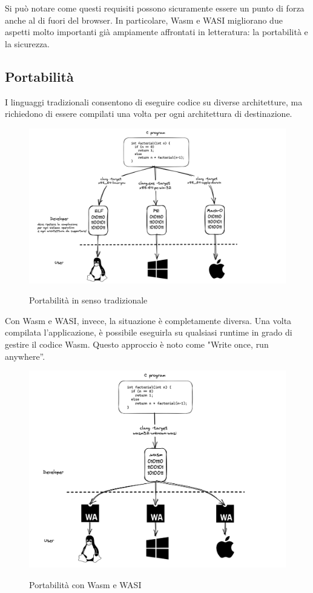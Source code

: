 Si può notare come questi requisiti possono sicuramente essere un punto di forza anche al di fuori del browser. In
particolare, Wasm e WASI migliorano due aspetti molto importanti già ampiamente affrontati in letteratura: la
portabilità e la sicurezza.

\subsection{Portabilità}
I linguaggi tradizionali consentono di eseguire codice su diverse architetture, ma richiedono di essere compilati una
volta per ogni architettura di destinazione.
\begin{figure}[H]
    \centering
    \captionsetup{justification=centering}
    \includegraphics[width=15cm]{./chapters/1.introduction/images/6.c_compilation_portability.png}
    \label{traditional_programming_portability}
    \caption{Portabilità in senso tradizionale}
\end{figure}
Con Wasm e WASI, invece, la situazione è completamente diversa. Una volta compilata l'applicazione, è possibile
eseguirla su qualsiasi runtime in grado di gestire il codice Wasm. Questo approccio è noto come "Write once, run
anywhere”.
\begin{figure}[H]
    \centering
    \captionsetup{justification=centering}
    \includegraphics[width=15cm]{./chapters/1.introduction/images/6.wasm_compilation_portability.png}
    \label{wasm_wasi_programming_portability}
    \caption{Portabilità con Wasm e WASI}
\end{figure}
